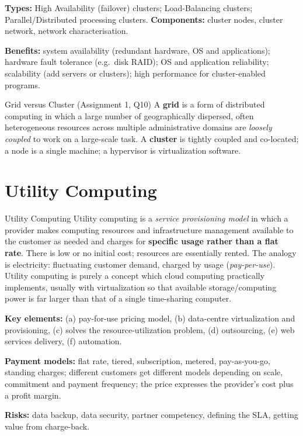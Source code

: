 \textbf{Types:} High Availability (failover) clusters; Load-Balancing clusters; Parallel/Distributed
processing clusters. \textbf{Components:} cluster nodes, cluster network, network characterisation.

\textbf{Benefits:} system availability (redundant hardware, OS and applications); hardware fault
tolerance (e.g.\ disk RAID); OS and application reliability; scalability (add servers or clusters);
high performance for cluster-enabled programs.

\begin{notebox}{Grid versus Cluster (Assignment 1, Q10)}
A \textbf{grid} is a form of distributed computing in which a large number of geographically
dispersed, often heterogeneous resources across multiple administrative domains are
\emph{loosely coupled} to work on a large-scale task. A \textbf{cluster} is tightly coupled and
co-located; a node is a single machine; a hypervisor is virtualization software.
\end{notebox}

\section{Utility Computing}
\begin{defbox}{Utility Computing}
Utility computing is a \emph{service provisioning model} in which a provider makes computing
resources and infrastructure management available to the customer as needed and charges for
\textbf{specific usage rather than a flat rate}. There is low or no initial cost; resources are
essentially rented. The analogy is electricity: fluctuating customer demand, charged by usage
(\emph{pay-per-use}). Utility computing is purely a concept which cloud computing practically
implements, usually with virtualization so that available storage/computing power is far larger
than that of a single time-sharing computer.
\end{defbox}

\textbf{Key elements:} (a) pay-for-use pricing model, (b) data-centre virtualization and
provisioning, (c) solves the resource-utilization problem, (d) outsourcing, (e) web services
delivery, (f) automation.

\textbf{Payment models:} flat rate, tiered, subscription, metered, pay-as-you-go, standing charges;
different customers get different models depending on scale, commitment and payment frequency; the
price expresses the provider's cost plus a profit margin.

\textbf{Risks:} data backup, data security, partner competency, defining the SLA, getting value
from charge-back.

